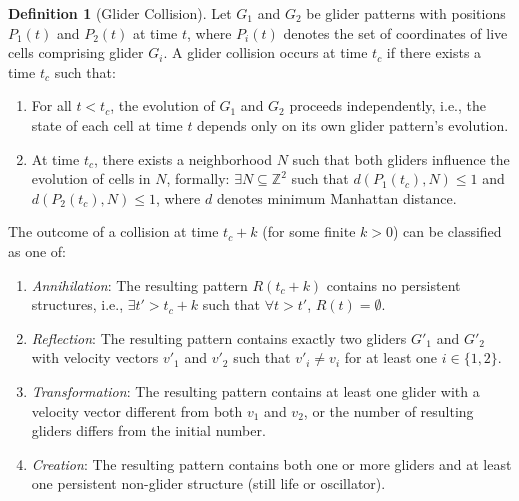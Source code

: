 \documentclass{article}
\theoremstyle{definition}
\newtheorem{definition}{Definition}[section]
\theoremstyle{plain}
\theoremstyle{plain}
\begin{document}
\begin{definition}[Glider Collision]
Let $G_1$ and $G_2$ be glider patterns with positions $P_1(t)$ and $P_2(t)$ at time $t$, where $P_i(t)$ denotes the set of coordinates of live cells comprising glider $G_i$. A glider collision occurs at time $t_c$ if there exists a time $t_c$ such that:
\begin{enumerate}
  \item For all $t < t_c$, the evolution of $G_1$ and $G_2$ proceeds independently, i.e., the state of each cell at time $t$ depends only on its own glider pattern's evolution.
  \item At time $t_c$, there exists a neighborhood $N$ such that both gliders influence the evolution of cells in $N$, formally: $\exists N \subseteq \mathbb{Z}^2$ such that $d(P_1(t_c), N) \leq 1$ and $d(P_2(t_c), N) \leq 1$, where $d$ denotes minimum Manhattan distance.
\end{enumerate}

The outcome of a collision at time $t_c+k$ (for some finite $k > 0$) can be classified as one of:
\begin{enumerate}
  \item \textit{Annihilation}: The resulting pattern $R(t_c+k)$ contains no persistent structures, i.e., $\exists t' > t_c+k$ such that $\forall t > t'$, $R(t) = \emptyset$.
  \item \textit{Reflection}: The resulting pattern contains exactly two gliders $G'_1$ and $G'_2$ with velocity vectors $v'_1$ and $v'_2$ such that $v'_i \neq v_i$ for at least one $i \in \{1,2\}$.
  \item \textit{Transformation}: The resulting pattern contains at least one glider with a velocity vector different from both $v_1$ and $v_2$, or the number of resulting gliders differs from the initial number.
  \item \textit{Creation}: The resulting pattern contains both one or more gliders and at least one persistent non-glider structure (still life or oscillator).
\end{enumerate}
\end{definition}

\end{document}
